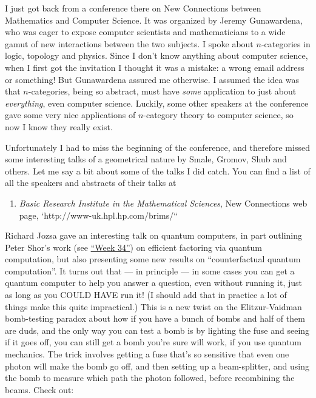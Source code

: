 \documentclass{article}
\def\tightlist{}
\begin{document}
I just got back from a conference there on New Connections between
Mathematics and Computer Science. It was organized by Jeremy
Gunawardena, who was eager to expose computer scientists and
mathematicians to a wide gamut of new interactions between the two
subjects. I spoke about \(n\)-categories in logic, topology and physics.
Since I don't know anything about computer science, when I first got the
invitation I thought it was a mistake: a wrong email address or
something! But Gunawardena assured me otherwise. I assumed the idea was
that \(n\)-categories, being so abstract, must have \emph{some}
application to just about \emph{everything}, even computer science.
Luckily, some other speakers at the conference gave some very nice
applications of \(n\)-category theory to computer science, so now I know
they really exist.

Unfortunately I had to miss the beginning of the conference, and
therefore missed some interesting talks of a geometrical nature by
Smale, Gromov, Shub and others. Let me say a bit about some of the talks
I did catch. You can find a list of all the speakers and abstracts of
their talks at

\begin{enumerate}
\def\labelenumi{\arabic{enumi})}
\tightlist
\item
  \emph{Basic Research Institute in the Mathematical Sciences}, New
  Connections web page, `http://www-uk.hpl.hp.com/brims/``
\end{enumerate}

Richard Jozsa gave an interesting talk on quantum computers, in part
outlining Peter Shor's work (see \protect\hyperlink{week34}{``Week
34''}) on efficient factoring via quantum computation, but also
presenting some new results on ``counterfactual quantum computation''.
It turns out that --- in principle --- in some cases you can get a
quantum computer to help you answer a question, even without running it,
just as long as you COULD HAVE run it! (I should add that in practice a
lot of things make this quite impractical.) This is a new twist on the
Elitzur-Vaidman bomb-testing paradox about how if you have a bunch of
bombs and half of them are duds, and the only way you can test a bomb is
by lighting the fuse and seeing if it goes off, you can still get a bomb
you're sure will work, if you use quantum mechanics. The trick involves
getting a fuse that's so sensitive that even one photon will make the
bomb go off, and then setting up a beam-splitter, and using the bomb to
measure which path the photon followed, before recombining the beams.
Check out:
\end{document}
